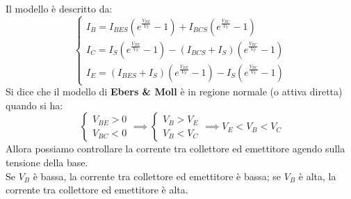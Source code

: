 \documentclass[../main.tex]{subfiles}
\begin{document}
	Il modello è descritto da:
	$$\begin{cases} 
		I_B = I_{BES} \left( e^{\frac{V_{BE}}{V_T}} - 1 \right) + I_{BCS} \left( e^{\frac{V_{BC}}{V_T}} - 1 \right) \\ 
		I_C = I_S \left( e^{\frac{V_{BE}}{V_T}} - 1 \right) - (I_{BCS} + I_S) \left( e^{\frac{V_{BC}}{V_T}} - 1 \right) \\ 
		I_E = (I_{BES} + I_S) \left( e^{\frac{V_{BE}}{V_T}} - 1 \right) - I_S \left( e^{\frac{V_{BC}}{V_T}} - 1 \right) 
	\end{cases}$$
	Si dice che il modello di \textbf{Ebers \& Moll} è in regione normale (o attiva diretta) quando si ha:
	$$\begin{cases} V_{BE} > 0 \\ V_{BC} < 0 \end{cases} \implies \begin{cases} V_B > V_E \\ V_B < V_C \end{cases} \implies V_E < V_B < V_C$$
	Allora possiamo controllare la corrente tra collettore ed emettitore agendo sulla tensione della base. \\
	Se $V_B$ è bassa, la corrente tra collettore ed emettitore è bassa; se $V_B$ è alta, la corrente tra collettore ed emettitore è alta.
\end{document}
